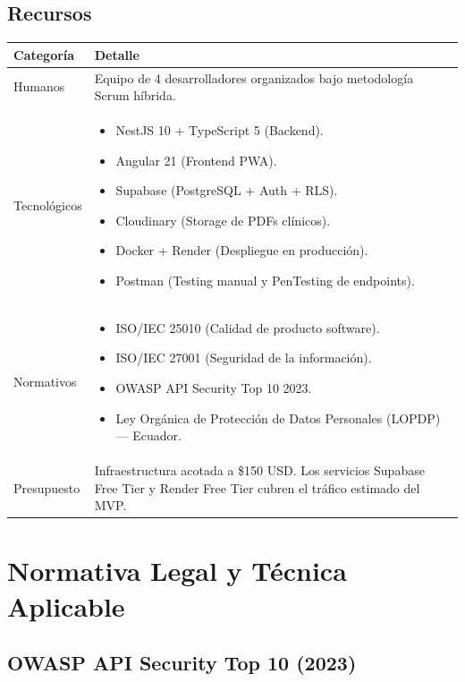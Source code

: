 \documentclass[a4paper,12pt]{article}
\begin{document}
\subsection{Recursos}

\begin{table}[H]
\centering
\begin{tabular}{|p{4cm}|p{10cm}|}
\hline
\textbf{Categoría} & \textbf{Detalle} \\
\hline
Humanos & Equipo de 4 desarrolladores organizados bajo metodología Scrum híbrida. \\
\hline
Tecnológicos &
\begin{itemize}
\item NestJS 10 + TypeScript 5 (Backend).
\item Angular 21 (Frontend PWA).
\item Supabase (PostgreSQL + Auth + RLS).
\item Cloudinary (Storage de PDFs clínicos).
\item Docker + Render (Despliegue en producción).
\item Postman (Testing manual y PenTesting de endpoints).
\end{itemize} \\
\hline
Normativos &
\begin{itemize}
\item ISO/IEC 25010 (Calidad de producto software).
\item ISO/IEC 27001 (Seguridad de la información).
\item OWASP API Security Top 10 2023.
\item Ley Orgánica de Protección de Datos Personales (LOPDP) — Ecuador.
\end{itemize} \\
\hline
Presupuesto & Infraestructura acotada a \$150 USD. Los servicios Supabase Free Tier y Render Free Tier cubren el tráfico estimado del MVP. \\
\hline
\end{tabular}
\end{table}

\section{Normativa Legal y Técnica Aplicable}

\subsection{OWASP API Security Top 10 (2023)}
\end{document}
